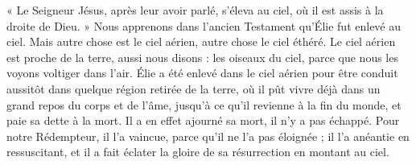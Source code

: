 « Le Seigneur Jésus, après leur avoir parlé, s’éleva au ciel, où il est assis à la droite de Dieu. » Nous apprenons dans l’ancien Testament qu’Élie fut enlevé au ciel. Mais autre chose est le ciel aérien, autre chose le ciel éthéré. Le ciel aérien est proche de la terre, aussi nous disons : les oiseaux du ciel, parce que nous les voyons voltiger dans l’air. Élie a été enlevé dans le ciel aérien pour être conduit aussitôt dans quelque région retirée de la terre, où il pût vivre déjà dans un grand repos du corps et de l’âme, jusqu’à ce qu’il revienne à la fin du monde, et paie sa dette à la mort. Il a en effet ajourné sa mort, il n’y a pas échappé. Pour notre Rédempteur, il l’a vaincue, parce qu’il ne l’a pas éloignée ; il l’a anéantie en ressuscitant, et il a fait éclater la gloire de sa résurrection en montant au ciel.
